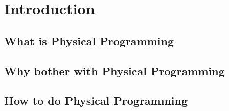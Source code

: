 \chapter{Introduction}



\section{What is Physical Programming}

\section{Why bother with Physical Programming}

\section{How to do Physical Programming}